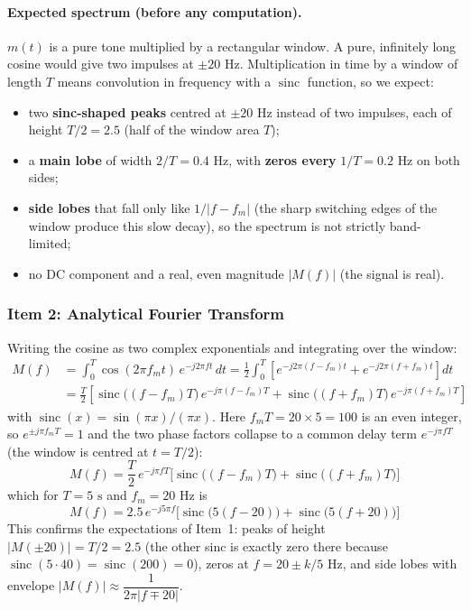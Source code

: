 \documentclass[a4paper]{article}
\begin{document}
\paragraph{Expected spectrum (before any computation).}
$m(t)$ is a pure tone multiplied by a rectangular window. A pure, infinitely long cosine would give two impulses at $\pm 20\text{ Hz}$. Multiplication in time by a window of length $T$ means convolution in frequency with a $\operatorname{sinc}$ function, so we expect:
\begin{itemize}
    \item two \textbf{sinc-shaped peaks} centred at $\pm 20\text{ Hz}$ instead of two impulses, each of height $T/2 = 2.5$ (half of the window area $T$);
    \item a \textbf{main lobe} of width $2/T = 0.4\text{ Hz}$, with \textbf{zeros every} $1/T = 0.2\text{ Hz}$ on both sides;
    \item \textbf{side lobes} that fall only like $1/|f - f_m|$ (the sharp switching edges of the window produce this slow decay), so the spectrum is not strictly band-limited;
    \item no DC component and a real, even magnitude $|M(f)|$ (the signal is real).
\end{itemize}

\subsubsection{Item 2: Analytical Fourier Transform}

Writing the cosine as two complex exponentials and integrating over the window:
\begin{align}
M(f) &= \int_{0}^{T}\cos(2\pi f_m t)\,e^{-j2\pi f t}\,dt
      = \frac{1}{2}\int_{0}^{T}\left[e^{-j2\pi (f-f_m)t} + e^{-j2\pi (f+f_m)t}\right]dt \nonumber\\
     &= \frac{T}{2}\left[\operatorname{sinc}\big((f-f_m)T\big)\,e^{-j\pi (f-f_m)T} + \operatorname{sinc}\big((f+f_m)T\big)\,e^{-j\pi (f+f_m)T}\right]
\end{align}
with $\operatorname{sinc}(x) = \sin(\pi x)/(\pi x)$. Here $f_m T = 20 \times 5 = 100$ is an even integer, so $e^{\pm j\pi f_m T} = 1$ and the two phase factors collapse to a common delay term $e^{-j\pi f T}$ (the window is centred at $t = T/2$):
\begin{equation}
\boxed{M(f) = \frac{T}{2}\,e^{-j\pi f T}\Big[\operatorname{sinc}\big((f-f_m)T\big) + \operatorname{sinc}\big((f+f_m)T\big)\Big]}
\end{equation}
which for $T=5\text{ s}$ and $f_m = 20\text{ Hz}$ is
\begin{equation}
M(f) = 2.5\,e^{-j5\pi f}\Big[\operatorname{sinc}\big(5(f-20)\big) + \operatorname{sinc}\big(5(f+20)\big)\Big]
\end{equation}
This confirms the expectations of Item~1: peaks of height $|M(\pm 20)| = T/2 = 2.5$ (the other sinc is exactly zero there because $\operatorname{sinc}(5\cdot 40) = \operatorname{sinc}(200) = 0$), zeros at $f = 20 \pm k/5\text{ Hz}$, and side lobes with envelope $|M(f)| \approx \dfrac{1}{2\pi |f \mp 20|}$.
\end{document}
